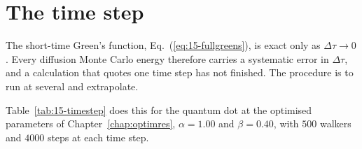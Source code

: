 \section{The time step}
\label{sec:dmctimestep}

The short-time Green's function, Eq.~(\ref{eq:15-fullgreens}), is exact only
as $\Delta\tau\to0$.  Every diffusion Monte Carlo energy therefore carries a
systematic error in $\Delta\tau$, and a calculation that quotes one time step
has not finished.  The procedure is to run at several and extrapolate.

Table~\ref{tab:15-timestep} does this for the quantum dot at the optimised
parameters of Chapter~\ref{chap:optimres}, $\alpha=1.00$ and $\beta=0.40$,
with $500$ walkers and $4000$ steps at each time step.

